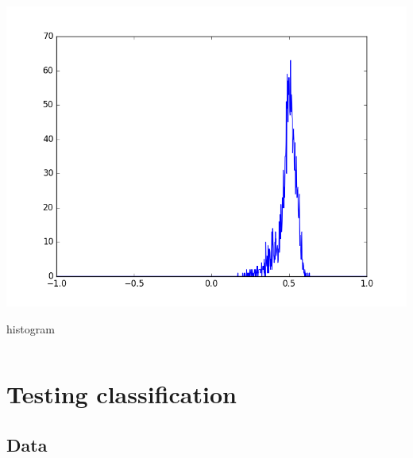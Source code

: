 \documentclass[c]{beamer}
\begin{document}
\begin{frame}
{\begin{columns}
\begin{column}{0.12\textwidth}
\begin{overlayarea}{\linewidth}{1.3cm}
    \centering\vfill
    \includegraphics[scale=0.07]{images/Porri/08_ndvi_histo.png}
  \end{overlayarea}
  \begin{overlayarea}{\linewidth}{0.5cm}
    \centering
    \tiny histogram \par
  \end{overlayarea}
 \end{column}
 
 
\end{columns}
}
\end{frame}



\section{Testing classification}
\begin{frame}
\tableofcontents[currentsection]
\end{frame}

\subsection{Data}
\begin{frame}
\tableofcontents[currentsubsection]
\end{frame}
\end{document}
